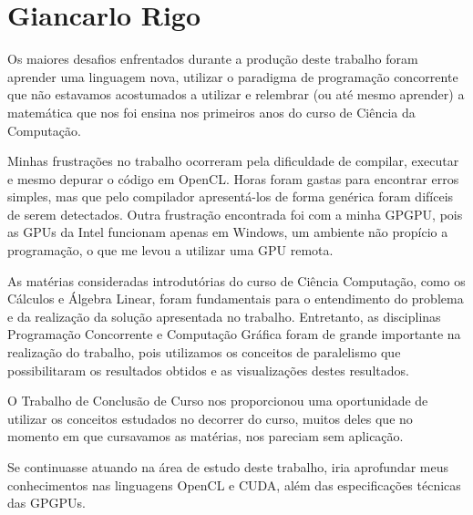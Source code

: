 \chapter{Giancarlo Rigo}
Os maiores desafios enfrentados durante a produção deste trabalho foram aprender uma linguagem nova, utilizar o paradigma de programação concorrente que não estavamos acostumados a utilizar e relembrar (ou até mesmo aprender) a matemática que nos foi ensina nos primeiros anos do curso de Ciência da Computação.

Minhas frustrações no trabalho ocorreram pela dificuldade de compilar, executar e mesmo depurar o código em OpenCL. Horas foram gastas para encontrar erros simples, mas que pelo compilador apresentá-los de forma genérica foram difíceis de serem detectados. Outra frustração encontrada foi com a minha GPGPU, pois as GPUs da Intel funcionam apenas em Windows, um ambiente não propício a programação, o que me levou a utilizar uma GPU remota.

As matérias consideradas introdutórias do curso de Ciência Computação, como os Cálculos e Álgebra Linear, foram fundamentais para o entendimento do problema e da realização da solução apresentada no trabalho. Entretanto, as disciplinas Programação Concorrente e Computação Gráfica foram de grande importante na realização do trabalho, pois utilizamos os conceitos de paralelismo que possibilitaram os resultados obtidos e as visualizações destes resultados.

O Trabalho de Conclusão de Curso nos proporcionou uma oportunidade de utilizar os conceitos estudados no decorrer do curso, muitos deles que no momento em que cursavamos as matérias, nos pareciam sem aplicação.

Se continuasse atuando na área de estudo deste trabalho, iria aprofundar meus conhecimentos nas linguagens OpenCL e CUDA, além das especificações técnicas das GPGPUs.
